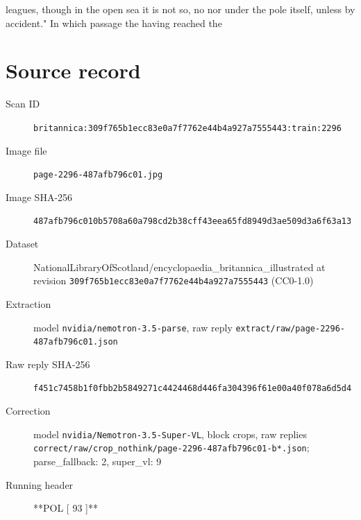 \documentclass{article}
\begin{document}
leagues, though in the open sea it is not so, no nor under the pole itself, unless by accident." In which passage the having reached the


\section*{Source record}
\begin{description}
\item[Scan ID] \texttt{britannica:309f765b1ecc83e0a7f7762e44b4a927a7555443:train:2296}
\item[Image file] \texttt{page-2296-487afb796c01.jpg}
\item[Image SHA-256] \texttt{487afb796c010b5708a60a798cd2b38cff43eea65fd8949d3ae509d3a6f63a13}
\item[Dataset] NationalLibraryOfScotland/encyclopaedia\_britannica\_illustrated at revision \texttt{309f765b1ecc83e0a7f7762e44b4a927a7555443} (CC0-1.0)
\item[Extraction] model \texttt{nvidia/nemotron-3.5-parse}, raw reply \texttt{extract/raw/page-2296-487afb796c01.json}
\item[Raw reply SHA-256] \texttt{f451c7458b1f0fbb2b5849271c4424468d446fa304396f61e00a40f078a6d5d4}
\item[Correction] model \texttt{nvidia/Nemotron-3.5-Super-VL}, block crops, raw replies \texttt{correct/raw/crop\_nothink/page-2296-487afb796c01-b*.json}; parse\_fallback: 2, super\_vl: 9
\item[Running header] **POL [ 93 ]**
\end{description}
\end{document}
